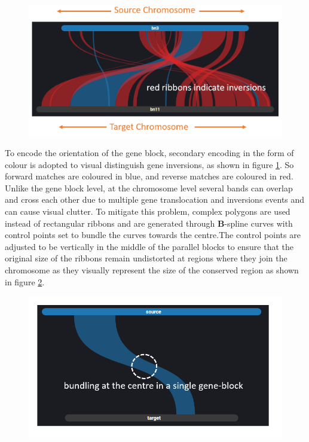 \begin{figure}[h]
  \centering
  \includegraphics[width=.60\linewidth]{images/ch_4_link_plot_chromosome_a.PNG}
  \label{fig:ch_4_link_plot_chromosome_a}
\end{figure}


To encode the orientation of the gene block, secondary encoding in the form of colour is adopted to visual distinguish gene inversions, as shown in figure \ref{fig:ch_4_link_plot_chromosome_a}. So forward matches are coloured in blue, and reverse matches are coloured in red. Unlike the gene block level, at the chromosome level several bands can overlap and cross each other due to multiple gene translocation and inversions events and can cause visual clutter. To mitigate this problem, complex polygons are used instead of rectangular ribbons and are generated through \textbf{B}-spline curves\cite{ref851370272} with control points set to bundle the curves towards the centre.The control points are adjusted to be vertically in the middle of the parallel blocks to ensure that the original size of the ribbons remain undistorted at regions where they join the chromosome as they visually represent the size of the conserved region as shown in figure \ref{fig:ch_4_link_plot_chromosome_b}. 

\begin{figure}
  \centering
  \includegraphics[width=.50\linewidth]{images/ch_4_link_plot_chromosome_b.PNG}
  \label{fig:ch_4_link_plot_chromosome_b}
\end{figure}



